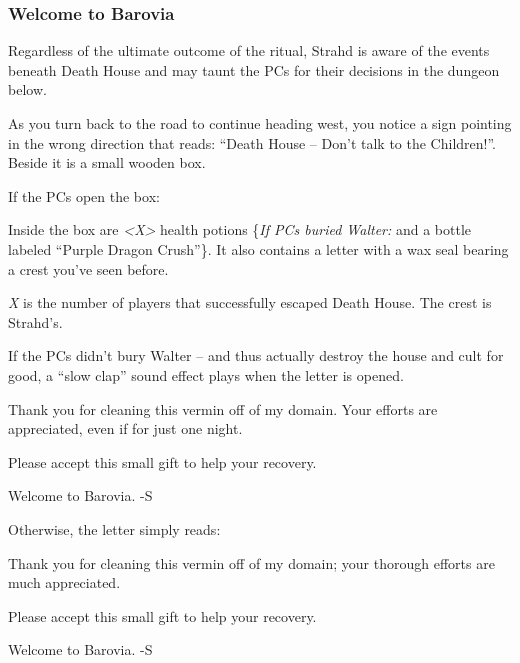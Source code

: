 \subsubsection*{Welcome to Barovia}
Regardless of the ultimate outcome of the ritual, Strahd is aware of the events beneath Death House and may taunt
the PCs for their decisions in the dungeon below.
\begin{readout}
  As you turn back to the road to continue heading west, you notice a sign pointing in the wrong direction that
  reads: ``Death House -- Don't talk to the Children!''. Beside it is a small wooden box.
\end{readout}
If the PCs open the box:
\begin{readout}
  Inside the box are \textit{<X>} health potions \{\textit{If PCs buried Walter:} and a bottle labeled ``Purple 
  Dragon Crush''\}. It also contains a letter with a wax seal bearing a crest you've seen before.
\end{readout}
\textit{X} is the number of players that successfully escaped Death House. The crest is Strahd's.

If the PCs didn't bury Walter -- and thus actually destroy the house and cult for good, a ``slow clap'' sound 
effect plays when the letter is opened.
\begin{handout}
  Thank you for cleaning this vermin off of my domain. Your efforts are appreciated, even if for just one night.
  
  Please accept this small gift to help your recovery.
  
  Welcome to Barovia. -S
\end{handout}
Otherwise, the letter simply reads:
\begin{handout}
  Thank you for cleaning this vermin off of my domain; your thorough efforts are much appreciated.
  
  Please accept this small gift to help your recovery.
  
  Welcome to Barovia. -S
\end{handout}
